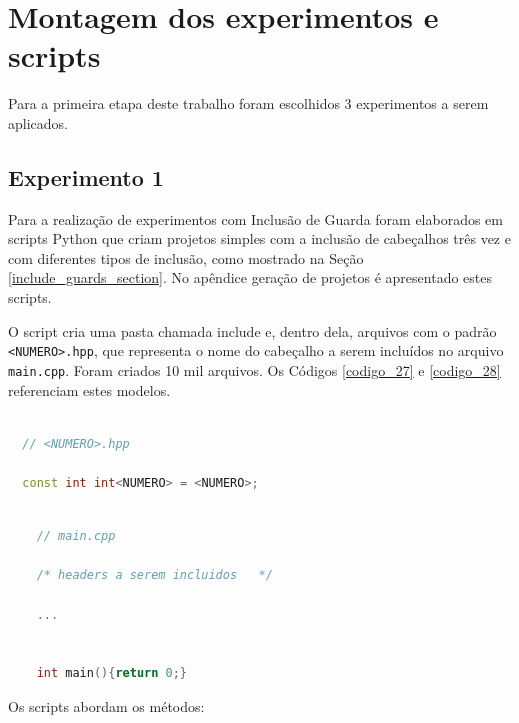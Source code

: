 \section{Montagem dos experimentos e scripts}

Para a primeira etapa deste trabalho foram escolhidos 3 experimentos a
 serem aplicados.

\subsection{Experimento 1}\label{experimento_1}

Para a realização de experimentos com Inclusão de Guarda foram elaborados
 em scripts Python que criam projetos simples com a inclusão de cabeçalhos
 três vez e com diferentes tipos de inclusão, como mostrado na  Seção
 \ref{include_guards_section}.
 No apêndice geração de projetos é apresentado estes scripts.

O script cria uma pasta chamada include e, dentro dela, arquivos com o padrão
 \texttt{<NUMERO>.hpp}, que representa o nome do cabeçalho a serem incluídos no arquivo 
\texttt{main.cpp}.
 Foram criados 10 mil arquivos. Os Códigos \ref{codigo_27} e  \ref{codigo_28}
 referenciam estes modelos.



\begin{lstlisting}[language=C++,caption={Arquivo .hpp gerado pelos scripts de guardas de inclusão},
                                                   label=codigo_27]

  // <NUMERO>.hpp

  const int int<NUMERO> = <NUMERO>;

\end{lstlisting}



\begin{lstlisting}[language=C++,caption={
  Arquivo main.cpp criado pelos scripts de guardas de inclusão},
                                                          label=codigo_28]

    // main.cpp

    /* headers a serem incluidos   */

    ...


    int main(){return 0;}

\end{lstlisting}




Os scripts abordam os métodos:

